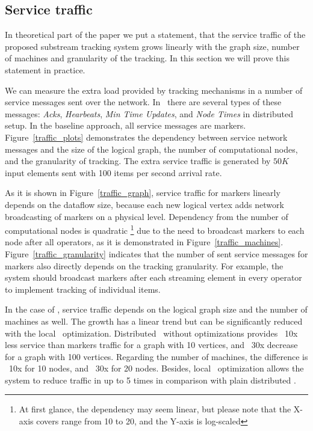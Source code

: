 \subsection{Service traffic}
\label{exp_network_traffic}
In theoretical part of the paper we put a statement, that the service traffic of the proposed substream tracking system grows linearly with the graph size, number of machines and granularity of the tracking. In this section we will prove this statement in practice. 

We can measure the extra load provided by tracking mechanisms in a number of service messages sent over the network. In \tracker\ there are several types of these messages: {\em Acks}, {\em Hearbeats}, {\em Min Time Updates}, and {\em Node Times} in distributed setup. In the baseline approach, all service messages are markers. Figure~\ref{traffic_plots} demonstrates the dependency between service network messages and the size of the logical graph, the number of computational nodes, and the granularity of tracking. The extra service traffic is generated by $50K$ input elements sent with 100 items per second arrival rate. 

As it is shown in Figure~\ref{traffic_graph}, service traffic for markers linearly depends on the dataflow size, because each new logical vertex adds network broadcasting of markers on a physical level. Dependency from the number of computational nodes is quadratic \footnote{At first glance, the dependency may seem linear, but please note that the X-axis covers range from 10 to 20, and the Y-axis is log-scaled} due to the need to broadcast markers to each node after all operators, as it is demonstrated in Figure~\ref{traffic_machines}. Figure~\ref{traffic_granularity} indicates that the number of sent service messages for markers also directly depends on the tracking granularity. For example, the system should broadcast markers after each streaming element in every operator to implement tracking of individual items. 

In the case of \tracker , service traffic depends on the logical graph size and the number of machines as well. The growth has a linear trend but can be significantly reduced with the local \tracker\ optimization. Distributed \tracker\ without optimizations provides ~10x less service than markers traffic for a graph with 10 vertices, and ~30x decrease for a graph with 100 vertices. Regarding the number of machines, the difference is ~10x for 10 nodes, and ~30x for 20 nodes. Besides, local \tracker\ optimization allows the system to reduce traffic in up to 5 times in comparison with plain distributed \tracker.

